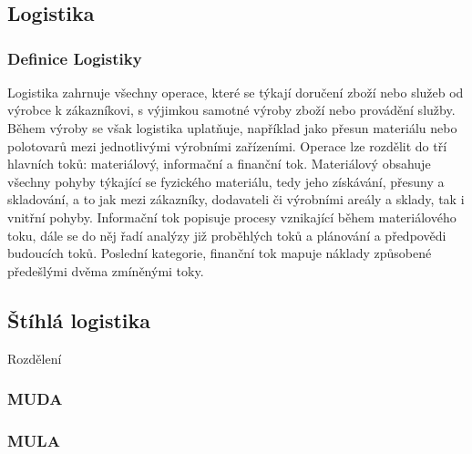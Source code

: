 \chapter{}

\cite{bib:Jones}

\section{Logistika}

\subsection*{Definice Logistiky}

Logistika zahrnuje všechny operace, které se týkají doručení zboží nebo služeb od výrobce k zákazníkovi, s výjimkou samotné výroby zboží nebo provádění služby.
Během výroby se však logistika uplatňuje, například jako přesun materiálu nebo polotovarů mezi jednotlivými výrobními zařízeními. 
Operace lze rozdělit do tří hlavních toků: materiálový, informační a finanční tok. Materiálový obsahuje všechny pohyby týkající se fyzického materiálu, tedy jeho získávání, přesuny a skladování, a to jak mezi zákazníky, dodavateli či výrobními areály a sklady, tak i vnitřní pohyby. Informační tok popisuje procesy vznikající během materiálového toku, dále se do něj řadí analýzy již proběhlých toků a plánování a předpovědi budoucích toků. Poslední kategorie, finanční tok mapuje náklady způsobené předešlými dvěma zmíněnými toky.\cite{bib:Baudin}

\section{Štíhlá logistika}

Rozdělení 

\subsection*{MUDA}
\subsection*{MULA}